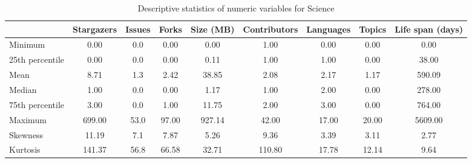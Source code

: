 
\begin{table}[h!]
\centering
\begin{adjustbox}{center}
\begin{tabular}{lcccccccc}
\toprule
{} &  Stargazers &  Issues &  Forks &  Size (MB) &  Contributors &  Languages &  Topics &  Life span (days) \\
\midrule
Minimum         &        0.00 &     0.0 &   0.00 &    0.00 &          1.00 &       0.00 &    0.00 &       0.00 \\
25th percentile &        0.00 &     0.0 &   0.00 &    0.11 &          1.00 &       1.00 &    0.00 &      38.00 \\
Mean            &        8.71 &     1.3 &   2.42 &   38.85 &          2.08 &       2.17 &    1.17 &     590.09 \\
Median          &        1.00 &     0.0 &   0.00 &    1.17 &          1.00 &       2.00 &    0.00 &     278.00 \\
75th percentile &        3.00 &     0.0 &   1.00 &   11.75 &          2.00 &       3.00 &    0.00 &     764.00 \\
Maximum         &      699.00 &    53.0 &  97.00 &  927.14 &         42.00 &      17.00 &   20.00 &    5609.00 \\
Skewness        &       11.19 &     7.1 &   7.87 &    5.26 &          9.36 &       3.39 &    3.11 &       2.77 \\
Kurtosis        &      141.37 &    56.8 &  66.58 &   32.71 &        110.80 &      17.78 &   12.14 &       9.64 \\
\bottomrule
\end{tabular}
\end{adjustbox}
\caption{Descriptive statistics of numeric variables for Science}
\end{table}
